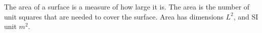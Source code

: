 The area of a surface is a measure of how large it is. 
  The area is the number
  of unit squares that are needed to cover the surface. 
  Area has dimensions $L^{2}$, and SI unit $m^{2}.$